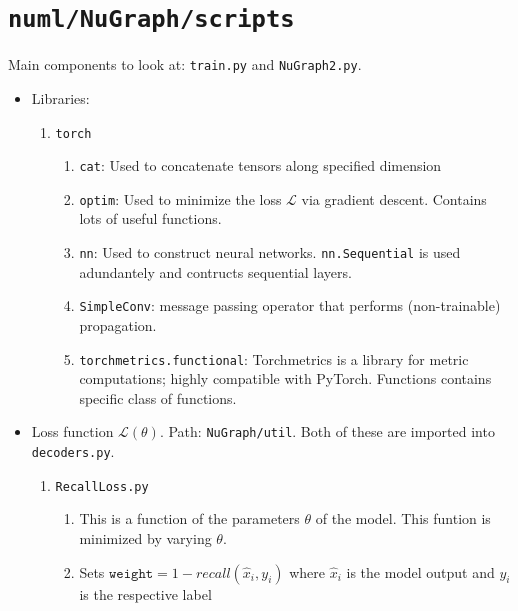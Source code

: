 \section{\texttt{numl/NuGraph/scripts}}

Main components to look at: \texttt{train.py} and \texttt{NuGraph2.py}.

\begin{itemize}
    \item Libraries:
        \begin{enumerate}
            \item \texttt{torch}
                \begin{enumerate}
                    \item \texttt{cat}: Used to concatenate tensors along specified dimension
                    \item \texttt{optim}: Used to minimize the loss $\mathcal{L}$ via gradient descent. Contains lots of useful functions.
                    \item \texttt{nn}: Used to construct neural networks. \texttt{nn.Sequential} is used adundantely and contructs sequential layers.

                    \item \texttt{SimpleConv}: message passing operator that performs (non-trainable) propagation.
                    
                    \item \texttt{torchmetrics.functional}: Torchmetrics is a library for metric computations; highly compatible with PyTorch. Functions contains specific class of functions.
                \end{enumerate}
        \end{enumerate}
        
    \item Loss function $\mathcal{L}(\theta)$. Path: \texttt{NuGraph/util}. Both of these are imported into \texttt{decoders.py}.
    \begin{enumerate}
        \item \texttt{RecallLoss.py}
            \begin{enumerate}
                \item This is a function of the parameters $\theta$ of the model. This funtion is minimized by varying $\theta$.
                
                \item Sets $\texttt{weight} = 1 - recall(\hat{x}_i, y_i)$ where $\hat{x}_i$ is the model output and $y_i$ is the respective label
                

\end{enumerate}
\end{enumerate}
\end{itemize}
